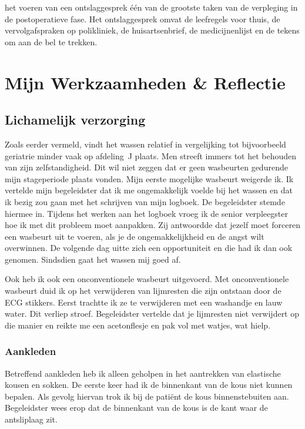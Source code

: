 \documentclass[nohyper,nobib]{tufte-book} %
\newcommand{\afdelingj}{afdeling~J }
\begin{document}
  het voeren van een ontslaggesprek één van de grootste taken van de verpleging in de postoperatieve fase. Het ontslaggesprek omvat de leefregels voor thuis, de vervolgafspraken op polikliniek, de huisartsenbrief, de medicijnenlijst en de tekens om aan de bel te trekken.
 \part{Mijn Werkzaamheden \& Reflectie}

 \chapter{Lichamelijk verzorging}
 Zoals eerder vermeld, vindt het wassen relatief in vergelijking tot bijvoorbeeld geriatrie minder vaak op \afdelingj plaats. Men streeft immers tot het behouden van zijn zelfstandigheid\cite{rensen}. Dit wil niet zeggen dat er geen wasbeurten gedurende mijn stageperiode plaats vonden. Mijn eerste mogelijke wasbeurt weigerde ik. Ik vertelde mijn begeleidster dat ik me ongemakkelijk voelde bij het wassen en dat ik bezig zou gaan met het schrijven van mijn logboek. De begeleidster stemde hiermee in. Tijdens het werken aan het logboek vroeg ik de senior verpleegster hoe ik met dit probleem moet aanpakken. Zij antwoordde dat jezelf moet forceren een wasbeurt uit te voeren, als je de ongemakkelijkheid en de angst wilt overwinnen. De volgende dag uitte zich een opportuniteit en die had ik dan ook genomen. Sindsdien gaat het wassen mij goed af.

Ook heb ik ook een onconventionele wasbeurt uitgevoerd. Met onconventionele wasbeurt duid ik op het verwijderen van lijmresten die zijn ontstaan door de ECG stikkers. Eerst trachtte ik ze te verwijderen met een washandje en lauw water. Dit verliep stroef. Begeleidster vertelde dat je lijmresten niet verwijdert op die manier en reikte me een acetonflesje en pak vol met watjes, wat hielp.

\section{Aankleden}
Betreffend aankleden heb ik alleen geholpen in het aantrekken van elastische kousen en sokken. De eerste keer had ik de binnenkant van de kous niet kunnen bepalen. Als gevolg hiervan trok ik bij de patiënt de kous binnenstebuiten aan. Begeleidster wees erop dat de binnenkant van de kous is de kant waar de antsliplaag zit.
\end{document}
